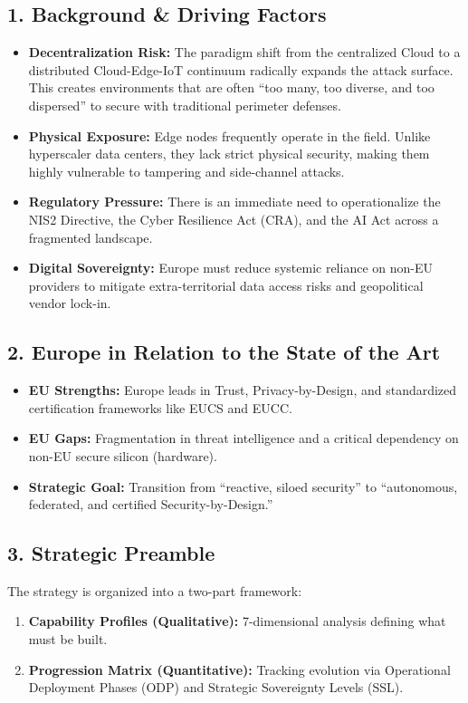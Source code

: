 \documentclass[12pt,a4paper]{article}
\begin{document}
\subsection{1. Background \& Driving Factors}
\begin{itemize}
    \item \textbf{Decentralization Risk:} The paradigm shift from the centralized Cloud to a distributed Cloud-Edge-IoT continuum radically expands the attack surface. This creates environments that are often ``too many, too diverse, and too dispersed''  to secure with traditional perimeter defenses.
    \item \textbf{Physical Exposure:} Edge nodes frequently operate in the field. Unlike hyperscaler data centers, they lack strict physical security, making them highly vulnerable to tampering and side-channel attacks.
    \item \textbf{Regulatory Pressure:} There is an immediate need to operationalize the NIS2 Directive, the Cyber Resilience Act (CRA), and the AI Act across a fragmented landscape.
    \item \textbf{Digital Sovereignty:} Europe must reduce systemic reliance on non-EU providers to mitigate extra-territorial data access risks and geopolitical vendor lock-in.
\end{itemize}

\subsection{2. Europe in Relation to the State of the Art}
\begin{itemize}
    \item \textbf{EU Strengths:} Europe leads in Trust, Privacy-by-Design, and standardized certification frameworks like EUCS and EUCC.
    \item \textbf{EU Gaps:} Fragmentation in threat intelligence and a critical dependency on non-EU secure silicon (hardware).
    \item \textbf{Strategic Goal:} Transition from ``reactive, siloed security''  to ``autonomous, federated, and certified Security-by-Design.'' 
\end{itemize}

\subsection{3. Strategic Preamble}
The strategy is organized into a two-part framework:
\begin{enumerate}
    \item \textbf{Capability Profiles (Qualitative):} 7-dimensional analysis defining what must be built.
    \item \textbf{Progression Matrix (Quantitative):} Tracking evolution via Operational Deployment Phases (ODP) and Strategic Sovereignty Levels (SSL).
\end{enumerate}
\end{document}
